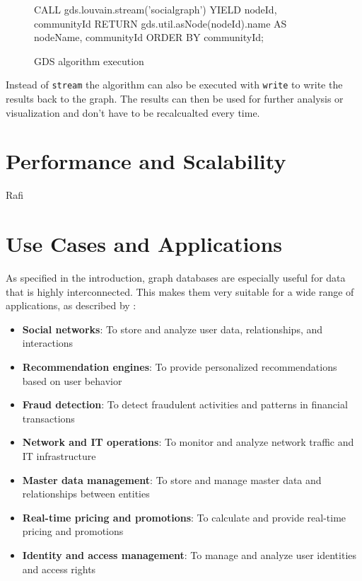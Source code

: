 \documentclass[english,smartquotes,apa]{hgbreport}
\begin{document}
\begin{figure}[h]
	\begin{GenericCode}[numbers=none]
		CALL gds.louvain.stream('socialgraph')
		YIELD nodeId, communityId
		RETURN gds.util.asNode(nodeId).name AS nodeName, communityId
		ORDER BY communityId;
	\end{GenericCode}
	\caption{GDS algorithm execution}
	\label{lst:gds-algorithm}
\end{figure}

Instead of \lstinline{stream} the algorithm can also be executed with \lstinline{write} to write the results back to the graph. The results can then be used for further analysis or visualization and don't have to be recalcualted every time.


\section*{Performance and Scalability}

Rafi


\section*{Use Cases and Applications}

As specified in the introduction, graph databases are especially useful for data that is highly interconnected. This makes them very suitable for a wide range of applications, as described by \cite{neo4j}:

\begin{itemize}
	\item \textbf{Social networks}: To store and analyze user data, relationships, and interactions
	\item \textbf{Recommendation engines}: To provide personalized recommendations based on user behavior
	\item \textbf{Fraud detection}: To detect fraudulent activities and patterns in financial transactions
	\item \textbf{Network and IT operations}: To monitor and analyze network traffic and IT infrastructure
	\item \textbf{Master data management}: To store and manage master data and relationships between entities
	\item \textbf{Real-time pricing and promotions}: To calculate and provide real-time pricing and promotions
	\item \textbf{Identity and access management}: To manage and analyze user identities and access rights
\end{itemize}
\end{document}
